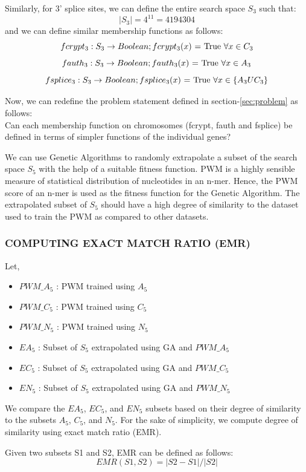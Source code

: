 \documentclass[12pt,a4paper]{article}
\begin{document}
	Similarly, for 3’ splice sites, we can define the entire search space $S_3$ such that:
	$$ |S_3| = 4^{11} = 4194304 $$
	and we can define similar membership functions as follows:
	$$ fcrypt_3:  S_3 \rightarrow Boolean; fcrypt_3(x)\textnormal{ = True  }\forall x \in C_3 $$
	$$ fauth_3: S_3 \rightarrow Boolean; fauth_3(x)\textnormal{ = True  }\forall x \in A_3 $$
	$$ fsplice_3: S_3 \rightarrow Boolean; fsplice_3(x)\textnormal{ = True  }\forall x \in \{A_3 U C_3\} $$
	
	Now, we can redefine the problem statement defined in section-\ref{sec:problem} as follows:\\
	Can each membership function on chromosomes (fcrypt, fauth and fsplice) be defined in terms of simpler functions of the individual genes? \par
	
	We can use Genetic Algorithms to randomly extrapolate a subset of the search space $S_5$ with the help of a suitable fitness function. PWM is a highly sensible measure of statistical distribution of nucleotides in an n-mer. Hence, the PWM score of an n-mer is used as the fitness function for the Genetic Algorithm. The extrapolated subset of $S_5$ should have a high degree of similarity to the dataset used to train the PWM as compared to other datasets. \par
	
	\subsubsection{COMPUTING EXACT MATCH RATIO (EMR)}
	Let,
	\begin{itemize}
		\item $PWM\_A_5$ : PWM trained using $A_5$
		\item $PWM\_C_5$ : PWM trained using $C_5$
		\item $PWM\_N_5$ : PWM trained using $N_5$
		\item $EA_5$ : Subset of $S_5$ extrapolated using GA and $PWM\_A_5$
		\item $EC_5$ : Subset of $S_5$ extrapolated using GA and $PWM\_C_5$
		\item $EN_5$ : Subset of $S_5$ extrapolated using GA and $PWM\_N_5$
	\end{itemize}
	
	We compare the $EA_5$, $EC_5$, and $EN_5$ subsets based on their degree of similarity to the subsets $A_5$, $C_5$, and $N_5$. For the sake of simplicity, we compute degree of similarity using exact match ratio (EMR). \par
	Given two subsets S1 and S2, EMR can be defined as follows:
	$$ EMR(S1, S2) = |S2 - S1| / |S2| $$
	
\end{document}
